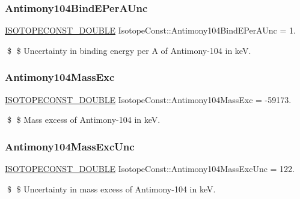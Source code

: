 \subsubsection{\texorpdfstring{Antimony104\+Bind\+E\+Per\+A\+Unc}{Antimony104BindEPerAUnc}}
{\footnotesize\ttfamily \mbox{\hyperlink{group___isotope_const-_macros_ga8f45a7272ce02c0b4c65c44636ed719a}{I\+S\+O\+T\+O\+P\+E\+C\+O\+N\+S\+T\+\_\+\+D\+O\+U\+B\+LE}} Isotope\+Const\+::\+Antimony104\+Bind\+E\+Per\+A\+Unc = 1.}

\$ \$ Uncertainty in binding energy per A of Antimony-\/104 in keV. \mbox{\label{group___isotope_const-_antimony-_sb104_ga20a0111caea0ec3600db11cbe94d2a65}} 
\subsubsection{\texorpdfstring{Antimony104\+Mass\+Exc}{Antimony104MassExc}}
{\footnotesize\ttfamily \mbox{\hyperlink{group___isotope_const-_macros_ga8f45a7272ce02c0b4c65c44636ed719a}{I\+S\+O\+T\+O\+P\+E\+C\+O\+N\+S\+T\+\_\+\+D\+O\+U\+B\+LE}} Isotope\+Const\+::\+Antimony104\+Mass\+Exc = -\/59173.}

\$ \$ Mass excess of Antimony-\/104 in keV. \mbox{\label{group___isotope_const-_antimony-_sb104_ga397094b29c8215ae4897076d811b927a}} 
\subsubsection{\texorpdfstring{Antimony104\+Mass\+Exc\+Unc}{Antimony104MassExcUnc}}
{\footnotesize\ttfamily \mbox{\hyperlink{group___isotope_const-_macros_ga8f45a7272ce02c0b4c65c44636ed719a}{I\+S\+O\+T\+O\+P\+E\+C\+O\+N\+S\+T\+\_\+\+D\+O\+U\+B\+LE}} Isotope\+Const\+::\+Antimony104\+Mass\+Exc\+Unc = 122.}

\$ \$ Uncertainty in mass excess of Antimony-\/104 in keV. \mbox{\label{group___isotope_const-_antimony-_sb104_ga01624d555156cc60362c9e06ae51de28}} 
